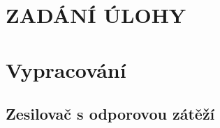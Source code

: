 \documentclass{protokol}
\begin{document}
	\maketitle

\section*{ZADÁNÍ ÚLOHY}
  
\setcounter{section}{0}

\newpage
\section{Vypracování}
  \subsection{Zesilovač s odporovou zátěží} 
  


%   

%   

\end{document}
